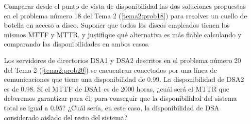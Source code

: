 \begin{problem}[9]
Comparar desde el punto de vista de disponibilidad las dos soluciones propuestas en el problema número 18 del Tema 2 (\ref{tema2:prob18}) para resolver un cuello de botella en acceso a disco. Suponer que todos los discos empleados tienen los mismos MTTF y MTTR, y justifique qué alternativa es más fiable calculando y comparando las disponibilidades en ambos casos.

\solution


\end{problem}

\begin{problem}[10]
Los servidores de directorios DSA1 y DSA2 descritos en el problema número 20 del Tema 2 (\ref{tema2:prob20}) se encuentran conectados por una línea de comunicaciones que tiene una disponibilidad de 0.99. La disponibilidad de DSA2 es de 0.98. Si el MTTF de DSA1 es de 2000 horas, ¿cuál será el MTTR que deberemos garantizar para él, para conseguir que la disponibilidad del sistema total se igual a 0.95? ¿Cuál sería, en este caso, la disponibilidad de DSA considerado aislado del resto del sistema?

\solution


\end{problem}

